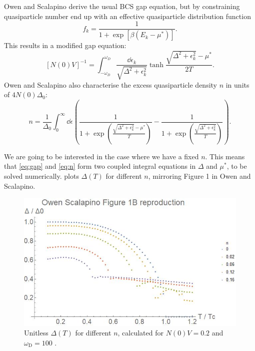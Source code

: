 \documentclass[%
 preprint,
 amsmath,amssymb,
 aps,
]{revtex4-2}
\newcommand{\debye}{\omega_{\mathrm{D}}}
\newcommand{\corr}{\mu^{\ast}}
\begin{document}
Owen and Scalapino derive the usual BCS gap equation, but by constraining quasiparticle number end up with an effective quasiparticle distribution function
\begin{equation}
	f_k = \frac{1}{1 + \exp[\beta \left(E_k - \corr \right)]}.
\end{equation}
This results in a modified gap equation:%
\begin{equation}
	\left[ N(0) V \right]^{-1} = \int_{- \omega_D}^{\omega_D} \frac{\dd{\epsilon_k}}{\sqrt{\Delta^2 + \epsilon_k^2}} \tanh{\frac{\sqrt{\Delta^2 + \epsilon_k^2} - \corr}{2 T}}. \label{eq:gap}
\end{equation}
Owen and Scalapino also characterise the excess quasiparticle density $n$ in units of $4 N(0) \Delta_0$:
\begin{equation}
	n = \frac{1}{\Delta_0} \int_0^\infty \dd{\epsilon} \left( \frac{1}{1 + \exp(\frac{\sqrt{\Delta^2 + \epsilon_k^2} - \corr}{T})} - \frac{1}{1 + \exp(\frac{\sqrt{\Delta^2 + \epsilon_k^2}}{T})} \right). \label{eq:n}
\end{equation}

We are going to be interested in the case where we have a fixed $n$. %
This means that \eqref{eq:gap} and \eqref{eq:n} form two coupled integral equations in $\Delta$ and $\corr$, to be solved numerically.
 plots $\Delta(T)$ for different $n$, mirroring Figure 1 in Owen and Scalapino\cite{OwenScalapino}. %

\begin{figure}[b]
	\includegraphics[width=\linewidth]{osGapVsTReproduction}
	\caption{\label{fig:osFig1Reproduction} Unitless $\Delta(T)$ for different $n$, calculated for $N(0)V = 0.2$ and $\debye = 100$ \cite{OwenScalapino}.}
\end{figure}
\end{document}
